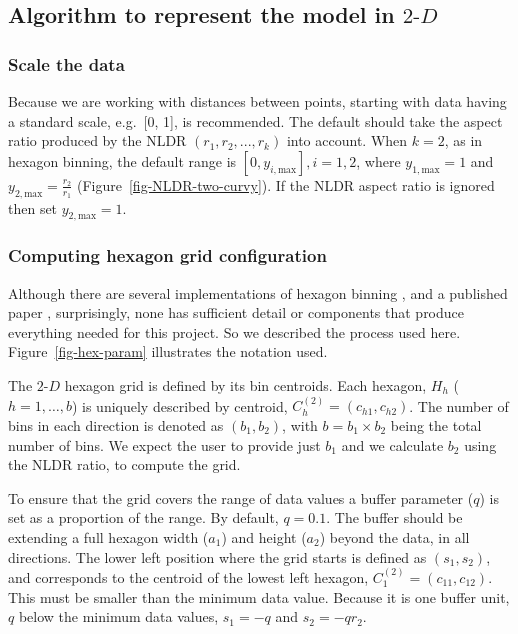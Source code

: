 \documentclass[
  12pt]{article}
\newcommand\gD{$2\text{-}D$}
\begin{document}
\subsection{\texorpdfstring{Algorithm to represent the model in
\gD{}}{Algorithm to represent the model in }}\label{algorithm-to-represent-the-model-in}

\subsubsection{Scale the data}\label{scale-the-data}

Because we are working with distances between points, starting with data
having a standard scale, e.g.~{[}0, 1{]}, is recommended. The default
should take the aspect ratio produced by the NLDR
\((r_1, r_2, ..., r_k)\) into account. When \(k=2\), as in hexagon
binning, the default range is \([0, y_{i,\text{max}}], i=1,2\), where
\(y_{1,\text{max}}=1\) and \(y_{2,\text{max}} = \frac{r_2}{r_1}\)
(Figure~\ref{fig-NLDR-two-curvy}). If the NLDR aspect ratio is ignored
then set \(y_ {2,\text{max}} = 1\).

\subsubsection{Computing hexagon grid
configuration}\label{computing-hexagon-grid-configuration}

Although there are several implementations of hexagon binning
\citep{carr1987}, and a published paper \citep{dan2023}, surprisingly,
none has sufficient detail or components that produce everything needed
for this project. So we described the process used here.
Figure~\ref{fig-hex-param} illustrates the notation used.

The \gD{} hexagon grid is defined by its bin centroids. Each hexagon,
\(H_h\) (\(h = 1, \dots, b\)) is uniquely described by centroid,
\(C_{h}^{(2)} = (c_{h1}, c_{h2})\). The number of bins in each direction
is denoted as \((b_1, b_2)\), with \(b = b_1 \times b_2\) being the
total number of bins. We expect the user to provide just \(b_1\) and we
calculate \(b_2\) using the NLDR ratio, to compute the grid.

To ensure that the grid covers the range of data values a buffer
parameter (\(q\)) is set as a proportion of the range. By default,
\(q=0.1\). The buffer should be extending a full hexagon width (\(a_1\))
and height (\(a_2\)) beyond the data, in all directions. The lower left
position where the grid starts is defined as \((s_1, s_2)\), and
corresponds to the centroid of the lowest left hexagon,
\(C_{1}^{(2)} = (c_{11}, c_{12})\). This must be smaller than the
minimum data value. Because it is one buffer unit, \(q\) below the
minimum data values, \(s_1 = -q\) and \(s_2 = -qr_2\).
\end{document}

